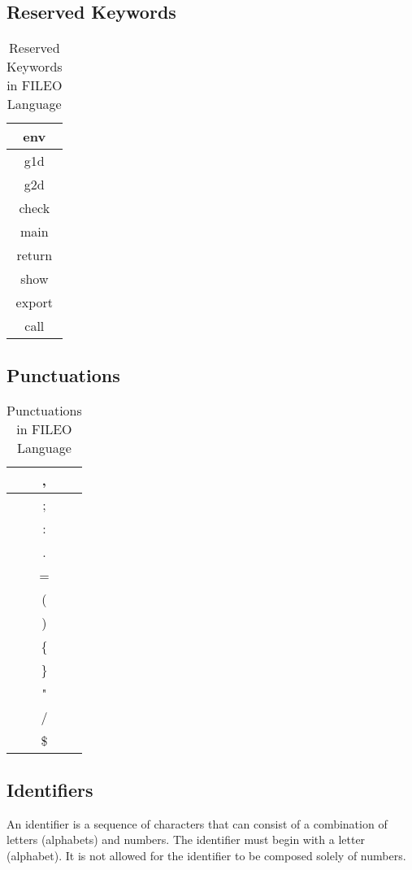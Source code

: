 \documentclass{article}
\begin{document}
\subsection{Reserved Keywords}
\begin{table}[h]
\centering
\caption{Reserved Keywords in FILEO Language}
\label{tab:ReservedKeywords}
\begin{tabular}{|c|}
\hline
env \\
\hline
g1d \\
\hline
g2d \\
\hline
 check\\
\hline
 main\\
\hline
return\\
\hline
show\\
\hline
export \\
\hline
call \\

\hline
\end{tabular}
\end{table}
\clearpage

\subsection{Punctuations}
\begin{table}[h]
\centering
\caption{Punctuations in FILEO Language}
\label{tab:Punctuations}
\begin{tabular}{|c|}
\hline
, \\
\hline
; \\
\hline
: \\
\hline
. \\
\hline
= \\
\hline
(\\
\hline
) \\
\hline
\{ \\
\hline
\} \\
\hline
" \\
\hline
/\\
\hline
\$\\
\hline
\end{tabular}
\end{table}
\subsection{Identifiers}
An identifier is a sequence of characters that can consist of a combination of letters (alphabets) and numbers. The identifier must begin with a letter (alphabet). It is not allowed for the identifier to be composed solely of numbers.
\end{document}

